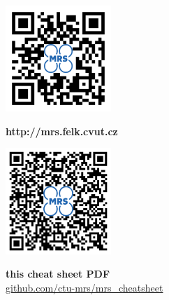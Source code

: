 \documentclass[a4paper,landscape]{article}
\begin{document}
\begin{multicols*}{2}
\begin{minipage}{0.40\textwidth}
\begin{center}
\begin{multicols*}{2}
         \end{multicols*}

         \begin{multicols*}{2}

           \begin{minipage}{0.40\textwidth}
             \includegraphics[height=4.0cm]{./fig/qr_mrs_website.png}
           \end{minipage}

           \begin{minipage}{0.60\textwidth}
             \begin{center}
               \vspace{5.2em}
               \large \textbf{http://mrs.felk.cvut.cz}\\
             \end{center}
           \end{minipage}

         \end{multicols*}

         \begin{multicols*}{2}

           \begin{minipage}{0.40\textwidth}
             \includegraphics[height=4.0cm]{./fig/qr_cheatsheet_pdf.png}
           \end{minipage}

           \begin{minipage}{0.60\textwidth}
             \begin{center}
               \vspace{5.2em}
               \large \textbf{this cheat sheet PDF}\\
               \small \url{github.com/ctu-mrs/mrs_cheatsheet}
             \end{center}
           \end{minipage}

         \end{multicols*}

       \end{center}
     \end{minipage}


  \end{multicols*}

  
\end{document}
